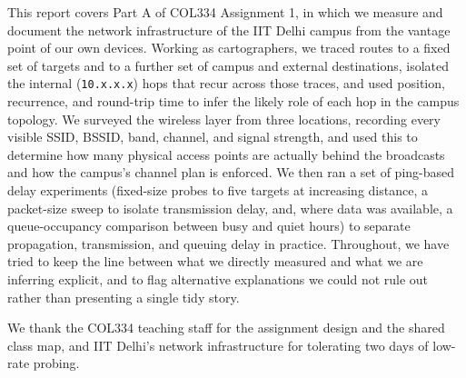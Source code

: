 \beforeabstract
{}

This report covers Part A of COL334 Assignment 1, in which we measure and document the
network infrastructure of the IIT Delhi campus from the vantage point of our own devices.
Working as cartographers, we traced routes to a fixed set of targets and to a further set of
campus and external destinations, isolated the internal (\texttt{10.x.x.x}) hops that recur across
those traces, and used position, recurrence, and round-trip time to infer the likely role of each
hop in the campus topology. We surveyed the wireless layer from three locations, recording
every visible SSID, BSSID, band, channel, and signal strength, and used this to determine how
many physical access points are actually behind the broadcasts and how the campus's channel
plan is enforced. We then ran a set of ping-based delay experiments (fixed-size probes to five
targets at increasing distance, a packet-size sweep to isolate transmission delay, and, where
data was available, a queue-occupancy comparison between busy and quiet hours) to separate
propagation, transmission, and queuing delay in practice. Throughout, we have tried to keep the
line between what we directly measured and what we are inferring explicit, and to flag
alternative explanations we could not rule out rather than presenting a single tidy story.

We thank the COL334 teaching staff for the assignment design and the shared class map, and
IIT Delhi's network infrastructure for tolerating two days of low-rate probing.

\afterpreface \afterabstract
